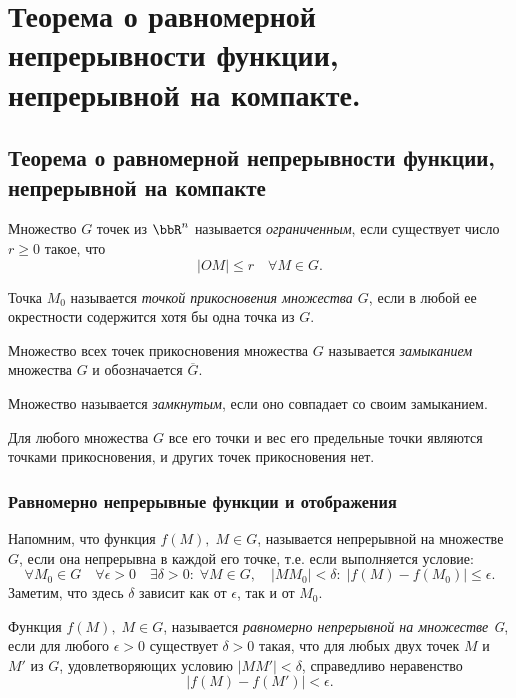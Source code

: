 \chapter{Теорема о равномерной непрерывности функции, непрерывной на компакте.}
\section{Теорема о равномерной непрерывности функции, непрерывной на компакте}

\begin{defn}
Множество $G$ точек из $\bbR ^n$ называется \textit{ограниченным}, если существует число $r\ge 0$ такое, что
$$
|OM|\le r \quad \forall M\in G.
$$
\end{defn}

\begin{defn}
Точка $M_0$ называется \textit{точкой прикосновения множества $G$}, если в любой ее окрестности содержится хотя бы одна точка из $G$.
\end{defn}

\begin{defn}
Множество всех точек прикосновения множества $G$ называется \textit{замыканием} множества $G$ и обозначается $\overline{G}$.
\end{defn}

\begin{defn}
Множество называется \textit{замкнутым}, если оно совпадает со своим замыканием.
\end{defn}

Для любого множества $G$ все его точки и вес его предельные точки являются точками прикосновения, и других точек прикосновения нет.

\subsection{Равномерно непрерывные функции и отображения}
Напомним, что функция $f(M),\;M\in G$, называется непрерывной на множестве $G$, если она непрерывна в каждой его точке, т.е. если выполняется условие:
\begin{equation}\label{yaa45e1}
\forall M_0\in G\quad \forall\epsilon>0 \quad \exists\delta>0:\;\forall M\in G,\quad |MM_0|<\delta:\;|f(M)-f(M_0)|\le\epsilon.
\end{equation}
Заметим, что здесь $\delta$ зависит как от $\epsilon$, так и от $M_0$.

\begin{defn}
Функция $f(M),\; M\in G$, называется \textit{равномерно непрерывной на множестве G}, если для любого $\epsilon>0$ существует $\delta>0$ такая, что для любых двух точек $M$ и $M'$ из $G$, удовлетворяющих условию $|MM'|<\delta$, справедливо неравенство
$$
|f(M)-f(M')|<\epsilon.
$$
\end{defn}

